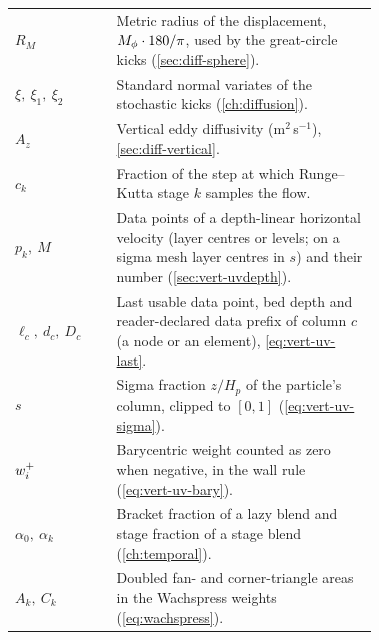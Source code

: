 \begin{longtable}{@{}l p{0.72\linewidth}@{}}
$R_M$ & Metric radius of the displacement, $M_{\phi}\cdot180/\pi$, used by the great-circle kicks (\cref{sec:diff-sphere}). \\
$\xi,\ \xi_1,\ \xi_2$ & Standard normal variates of the stochastic kicks (\cref{ch:diffusion}). \\
$A_z$ & Vertical eddy diffusivity (m$^2$\,s$^{-1}$), \cref{sec:diff-vertical}. \\
$c_k$ & Fraction of the step at which Runge--Kutta stage $k$ samples the flow. \\
$p_k,\ M$ & Data points of a depth-linear horizontal velocity (layer centres or levels; on a sigma mesh layer centres in $s$) and their number (\cref{sec:vert-uvdepth}). \\
$\ell_c,\ d_c,\ D_c$ & Last usable data point, bed depth and reader-declared data prefix of column $c$ (a node or an element), \cref{eq:vert-uv-last}. \\
$s$ & Sigma fraction $z/H_p$ of the particle's column, clipped to $[0,1]$ (\cref{eq:vert-uv-sigma}). \\
$w_{i}^{+}$ & Barycentric weight counted as zero when negative, in the wall rule (\cref{eq:vert-uv-bary}). \\
$\alpha_0,\ \alpha_k$ & Bracket fraction of a lazy blend and stage fraction of a stage blend (\cref{ch:temporal}). \\
$A_k,\ C_k$ & Doubled fan- and corner-triangle areas in the Wachspress weights (\cref{eq:wachspress}). \\
\bottomrule
\end{longtable}
